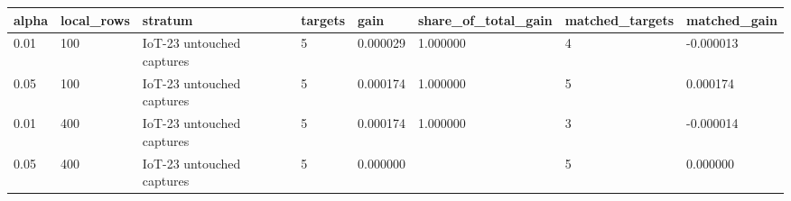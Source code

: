 \begin{tabular}{llllllll}
\toprule
alpha & local\_rows & stratum & targets & gain & share\_of\_total\_gain & matched\_targets & matched\_gain \\
\midrule
0.01 & 100 & IoT-23 untouched captures & 5 & 0.000029 & 1.000000 & 4 & -0.000013 \\
0.05 & 100 & IoT-23 untouched captures & 5 & 0.000174 & 1.000000 & 5 & 0.000174 \\
0.01 & 400 & IoT-23 untouched captures & 5 & 0.000174 & 1.000000 & 3 & -0.000014 \\
0.05 & 400 & IoT-23 untouched captures & 5 & 0.000000 &  & 5 & 0.000000 \\
\bottomrule
\end{tabular}
